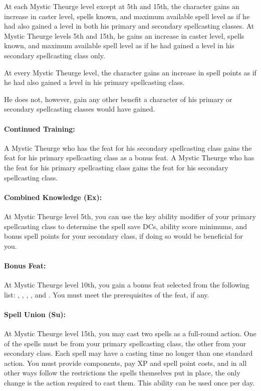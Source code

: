 At each Mystic Theurge level except at 5th and 15th, the character gains an increase in caster level, spells known, and maximum available spell level as if he had also gained a level in both his primary and secondary spellcasting classes. At Mystic Theurge levels 5th and 15th, he gains an increase in caster level, spells known, and maximum available spell level as if he had gained a level in his secondary spellcasting class only.

At every Mystic Theurge level, the character gains an increase in spell points as if he had also gained a level in his primary spellcasting class.

He does not, however, gain any other benefit a character of his primary or secondary spellcasting classes would have gained.
\paragraph{Continued Training:} A Mystic Theurge who has the  feat for his secondary spellcasting class gains the feat for his primary spellcasting class as a bonus feat. A Mystic Theurge who has the feat for his primary spellcasting class gains the feat for his secondary spellcasting class.

\paragraph{Combined Knowledge (Ex):} At Mystic Theurge level 5th, you can use the key ability modifier of your primary spellcasting class to determine the spell save DCs, ability score minimums, and bonus spell points for your secondary class, if doing so would be beneficial for you.

\paragraph{Bonus Feat:} At Mystic Theurge level 10th, you gain a bonus feat selected from the following list: , , , ,  and . You must meet the prerequisites of the feat, if any.

\paragraph{Spell Union (Su):} At Mystic Theurge level 15th, you may cast two spells as a full-round action. One of the spells must be from your primary spellcasting class, the other from your secondary class. Each spell may have a casting time no longer than one standard action. You must provide components, pay XP and spell point costs, and in all other ways follow the restrictions the spells themselves put in place, the only change is the action required to cast them. This ability can be used once per day.